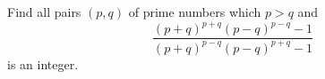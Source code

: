 Find all pairs $(p,q)$ of prime numbers which $p>q$ and
$$\frac{(p+q)^{p+q}(p-q)^{p-q}-1}{(p+q)^{p-q}(p-q)^{p+q}-1}$$is an integer.